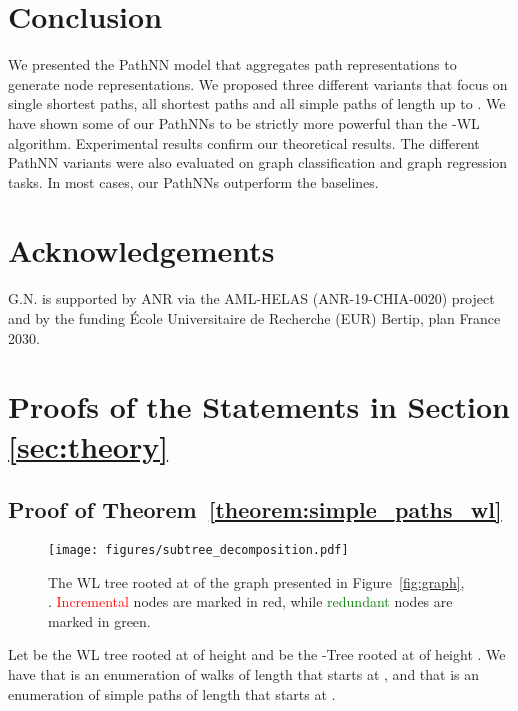 \documentclass{article}
\theoremstyle{plain}
\theoremstyle{definition}
\theoremstyle{remark}
\begin{document}
\section{Conclusion}
We presented the PathNN model that aggregates path representations to generate node representations.
We proposed three different variants that focus on single shortest paths, all shortest paths and all simple paths of length up to .
We have shown some of our PathNNs to be strictly more powerful than the -WL algorithm.
Experimental results confirm our theoretical results.
The different PathNN variants were also evaluated on graph classification and graph regression tasks.
In most cases, our PathNNs outperform the baselines.

\section*{Acknowledgements}
G.N. is supported by ANR via the AML-HELAS (ANR-19-CHIA-0020) project and by the funding \'Ecole Universitaire de Recherche (EUR) Bertip, plan France 2030.






\newpage
\appendix
\onecolumn


\section{Proofs of the Statements in Section \ref{sec:theory}}
\label{appendix:proofs}

\subsection{Proof of Theorem~\ref{theorem:simple_paths_wl}}

\begin{figure}[b]
    \centering
    \texttt{[image: figures/subtree\_decomposition.pdf]}
    \caption{The WL tree rooted at  of the graph presented in Figure~\ref{fig:graph}, . \textcolor{red}{Incremental} nodes are marked in red, while \textcolor{green}{redundant} nodes are marked in green.} 
    \label{fig:subtree_decomposition}
\end{figure}
Let  be the WL tree rooted at  of height  and  be the -Tree rooted at  of height . We have that  is an enumeration of walks of length  that starts at , and that  is an enumeration of simple paths of length  that starts at .
\end{document}
